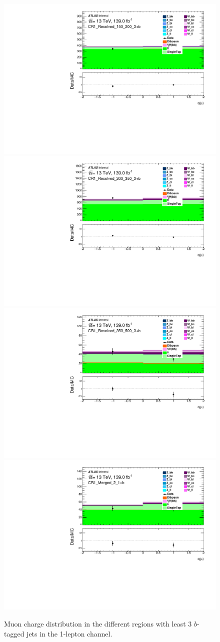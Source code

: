 \begin{figure}[!htb]
    \includegraphics[width=0.46\linewidth]{chapters/c8/figures/1L/DataMC_MonoH_Nominal_CR1_Resolved_150_200_3+b_mu_charge.pdf}
    \includegraphics[width=0.46\linewidth]{chapters/c8/figures/1L/DataMC_MonoH_Nominal_CR1_Resolved_200_350_3+b_mu_charge.pdf}\\
    \includegraphics[width=0.46\linewidth]{chapters/c8/figures/1L/DataMC_MonoH_Nominal_CR1_Resolved_350_500_3+b_mu_charge.pdf}
    \includegraphics[width=0.46\linewidth]{chapters/c8/figures/1L/DataMC_MonoH_Nominal_CR1_Merged_2_1+b_mu_charge.pdf}
    \caption{Muon charge distribution in the different \met regions with least 3 $b$-tagged jets in the 1-lepton channel.}
    \label{fig:data-mc-1l-mu-charge-3+b}
\end{figure}

